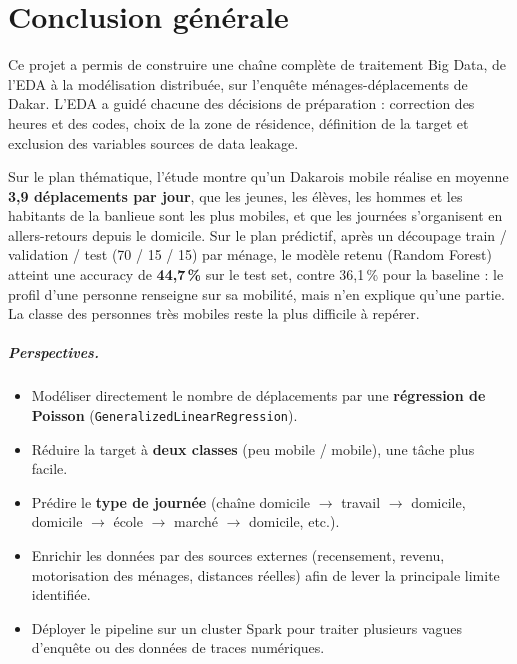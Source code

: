 \documentclass[12pt,a4paper]{report}
\newcommand{\code}[1]{\texttt{\small #1}}
\newcommand{\1}{\mathbf{1}}
\begin{document}
\chapter*{Conclusion générale}

Ce projet a permis de construire une chaîne complète de traitement Big Data, de l'EDA à la modélisation distribuée, sur l'enquête ménages-déplacements de Dakar. L'EDA a guidé chacune des décisions de préparation : correction des heures et des codes, choix de la zone de résidence, définition de la target et exclusion des variables sources de data leakage.

Sur le plan thématique, l'étude montre qu'un Dakarois mobile réalise en moyenne \textbf{3,9 déplacements par jour}, que les jeunes, les élèves, les hommes et les habitants de la banlieue sont les plus mobiles, et que les journées s'organisent en allers-retours depuis le domicile. Sur le plan prédictif, après un découpage train / validation / test (70 / 15 / 15) par ménage, le modèle retenu (Random Forest) atteint une accuracy de \textbf{44,7\,\%} sur le test set, contre 36,1\,\% pour la baseline : le profil d'une personne renseigne sur sa mobilité, mais n'en explique qu'une partie. La classe des personnes très mobiles reste la plus difficile à repérer.

\paragraph{Perspectives.}
\begin{itemize}[leftmargin=*]
  \item Modéliser directement le nombre de déplacements par une \textbf{régression de Poisson} (\code{GeneralizedLinearRegression}).
  \item Réduire la target à \textbf{deux classes} (peu mobile / mobile), une tâche plus facile.
  \item Prédire le \textbf{type de journée} (chaîne domicile $\rightarrow$ travail $\rightarrow$ domicile, domicile $\rightarrow$ école $\rightarrow$ marché $\rightarrow$ domicile, etc.).
  \item Enrichir les données par des sources externes (recensement, revenu, motorisation des ménages, distances réelles) afin de lever la principale limite identifiée.
  \item Déployer le pipeline sur un cluster Spark pour traiter plusieurs vagues d'enquête ou des données de traces numériques.
\end{itemize}
\end{document}
